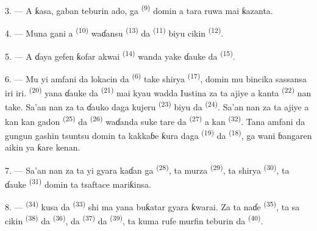 3. --- A ƙasa, gaban teburin ado, ga 
\textsuperscript{(9)} domin a tara ruwa mai ƙazanta.

4. --- Muna gani a  \textsuperscript{(10)} waɗansu
 \textsuperscript{(13)} da 
\textsuperscript{(11)} biyu cikin 
\textsuperscript{(12)}.

5. --- A ɗaya gefen ƙofar akwai 
\textsuperscript{(14)} wanda yake ɗauke da 
\textsuperscript{(15)}.

6. --- Mu yi amfani da lokacin da 
\textsuperscript{(6)} take shirya  \textsuperscript{(17)},
domin mu bincika sassansa iri iri. 
\textsuperscript{(20)} yana ɗauke da 
\textsuperscript{(21)} mai kyau wadda Iustina za ta ajiye a kanta
 \textsuperscript{(22)} nan take. Sa’an nan za ta
ɗauko daga kujeru  \textsuperscript{(23)} biyu da
 \textsuperscript{(24)}. Sa’an nan za ta ajiye a kan kan
gadon  \textsuperscript{(25)} da  \textsuperscript{(26)} waɗanda suke tare da 
\textsuperscript{(27)} a kan 
\textsuperscript{(32)}. Tana amfani da gungun gashin tsuntsu domin ta
kakkaɓe ƙura daga  \textsuperscript{(19)} da  \textsuperscript{(18)}, ga wani ɓangaren aikin ya ƙare kenan.

7. --- Sa’an nan za ta yi gyara kaɗan ga  \textsuperscript{(28)}, ta murza 
\textsuperscript{(29)}, ta shirya 
\textsuperscript{(30)}, ta ɗauke  \textsuperscript{(31)}
domin ta tsaftace mariƙinsa.

\VUsaut{5.0mm}
\VUsaut{3.0mm}

8. ---  \textsuperscript{(34)} kusa da
 \textsuperscript{(33)} shi ma yana buƙatar gyara
ƙwarai. Za ta naɗe  \textsuperscript{(35)}, ta sa
cikin  \textsuperscript{(38)}  da  \textsuperscript{(36)}, da 
\textsuperscript{(37)} da  \textsuperscript{(39)}, ta
kuma rufe murfin teburin da  \textsuperscript{(40)}.

